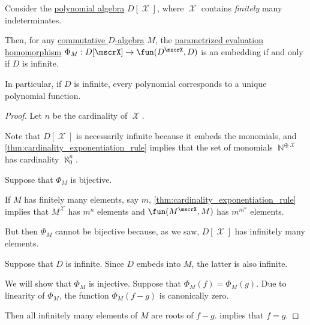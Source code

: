 \begin{corollary}\label{thm:parametrized_polynomial_evaluation_isomorphism}
  Consider the \hyperref[def:polynomial_algebra]{polynomial algebra} \( D[\mscrX] \), where \( \mscrX \) contains \emph{finitely} many indeterminates.

  Then, for any \hyperref[def:algebra_over_ring/commutative]{commutative \( D \)-algebra} \( M \), the \hyperref[con:free_construction/evaluation]{parametrized evaluation homomorphism} \( \Phi_M: D[\mscrX] \to \fun(D^\mscrX, D) \) is an embedding if and only if \( D \) is infinite.
\end{corollary}
\begin{comments}
  \item In particular, if \( D \) is infinite, every polynomial corresponds to a unique polynomial function.
\end{comments}
\begin{proof}
  Let \( n \) be the cardinality of \( \mscrX \).

  Note that \( D[\mscrX] \) is necessarily infinite because it embeds the monomials, and \cref{thm:cardinality_exponentiation_rule} implies that the set of monomials \( \BbbN^{\oplus \mscrX} \) has cardinality \( \aleph_0^n \).

  \SufficiencySubProof Suppose that \( \Phi_M \) is bijective.

  If \( M \) has finitely many elements, say \( m \), \cref{thm:cardinality_exponentiation_rule} implies that \( M^\mscrX \) has \( m^n \) elements and \( \fun(M^\mscrX, M) \) has \( m^{m^n} \) elements.

  But then \( \Phi_M \) cannot be bijective because, as we saw, \( D[\mscrX] \) has infinitely many elements.

  \NecessitySubProof Suppose that \( D \) is infinite. Since \( D \) embeds into \( M \), the latter is also infinite.

  We will show that \( \Phi_M \) is injective. Suppose that \( \Phi_M(f) = \Phi_M(g) \). Due to linearity of \( \Phi_M \), the function \( \Phi_M(f - g) \) is canonically zero.

  Then all infinitely many elements of \( M \) are roots of \( f - g \).  implies that \( f = g \).
\end{proof}

